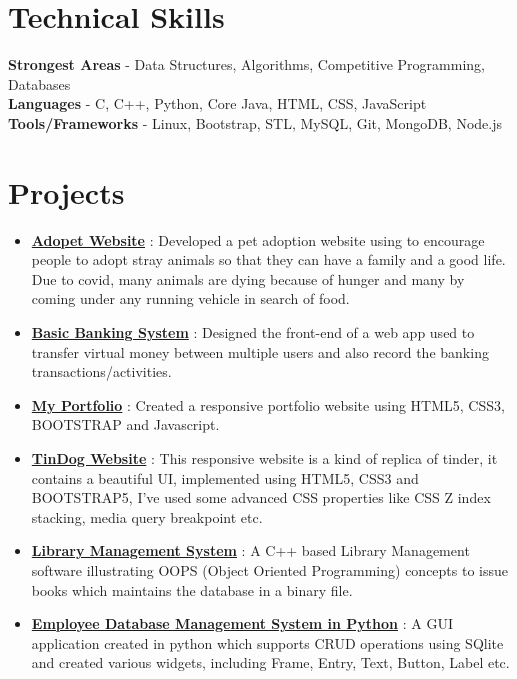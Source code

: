 \documentclass[margin, centered]{res}
\begin{document}
\begin{resume}
\section{Technical \hspace{2mm} Skills}
\textbf{Strongest Areas} - Data Structures, Algorithms, Competitive Programming, Databases \\
\textbf{Languages} - C, C++, Python, Core Java, HTML, CSS, JavaScript  \\
\textbf{Tools/Frameworks} - Linux, Bootstrap, STL, MySQL, Git, MongoDB, Node.js

\section{Projects}
\begin{itemize}[leftmargin=*]
  \item \textbf{\href{https://github.com/tannuchoudhary/basic_banking_system}{Adopet Website}} : Developed a pet adoption website using to encourage people to adopt stray animals so that they can have a family and a good life. Due to covid, many animals are dying because of hunger and many by coming under any running vehicle in search of food.
 \item \textbf{\href{https://github.com/tannuchoudhary/basic_banking_system}{Basic Banking System}} : Designed the front-end of a web app used to transfer virtual money between multiple users and also record the banking transactions/activities.
  \item \textbf{\href{https://tannuchoudhary.github.io/My-Portfolio/}{My Portfolio}} : Created a responsive portfolio website using HTML5, CSS3, BOOTSTRAP and Javascript.
  
 \item \textbf{\href{https://tannuchoudhary.github.io/TinDog/}{TinDog Website}} : This responsive website is a kind of replica of tinder, it contains a beautiful UI, implemented using HTML5, CSS3 and BOOTSTRAP5, I've used some advanced CSS properties like CSS Z index stacking, media query breakpoint etc.
 \item \textbf{\href{https://github.com/tannuchoudhary/Library-Management-System}{Library Management System}} : A C++ based Library Management software illustrating OOPS (Object Oriented Programming) concepts to issue books which maintains the database in a binary file.
 \item \textbf{\href{https://github.com/tannuchoudhary/TkinterProjects/tree/main/EmployeeDBMS}{Employee Database Management System in Python}} : A GUI application created in python which supports CRUD operations using SQlite and created various widgets, including Frame, Entry, Text, Button, Label etc.
 

\end{itemize}
\end{resume}
\end{document}
